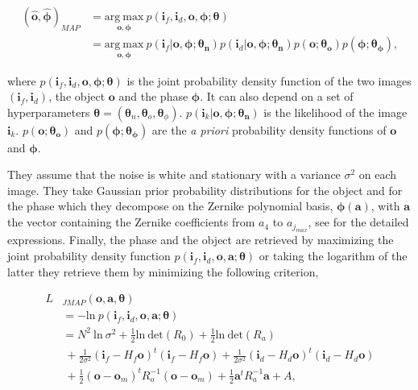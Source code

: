 \begin{align}
(\hat{\mathbf{o}},\hat{\boldsymbol{\phi}})_{MAP} &= \underset{\mathbf{o},\boldsymbol{\phi}}{\mathrm{arg \ max}} \ p(\mathbf{i}_f,\mathbf{i}_d,\mathbf{o},\boldsymbol{\phi};\boldsymbol{\theta})\nonumber \\
&= \underset{\mathbf{o},\boldsymbol{\phi}}{\mathrm{arg \ max}} \ p(\mathbf{i}_f|\mathbf{o},\boldsymbol{\phi};\boldsymbol{\theta_n})p(\mathbf{i}_d|\mathbf{o},\boldsymbol{\phi};\boldsymbol{\theta_n})p(\mathbf{o};\boldsymbol{\theta_o})p(\boldsymbol{\phi};\boldsymbol{\theta_{\phi}}), 
\end{align}

where $p(\mathbf{i}_f,\mathbf{i}_d,\mathbf{o},\boldsymbol{\phi};\boldsymbol{\theta})$ is the joint probability density function of the two images $(\mathbf{i}_f,\mathbf{i}_d)$, the object $\mathbf{o}$ and the phase $\boldsymbol{\phi}$. It can also depend on a set of hyperparameters $\boldsymbol{\theta} = (\boldsymbol{\theta}_n,\boldsymbol{\theta}_o,\boldsymbol{\theta}_{\phi})$. $p(\mathbf{i}_k|\mathbf{o},\boldsymbol{\phi};\boldsymbol{\theta_n})$ is the likelihood of the image $\mathbf{i}_k$. $p(\mathbf{o};\boldsymbol{\theta_o})$ and $p(\boldsymbol{\phi};\boldsymbol{\theta_{\phi}})$ are the \textit{a priori} probability density functions of $\mathbf{o}$ and $\boldsymbol{\phi}$.

They assume that the noise is white and stationary with a variance $\sigma^2$ on each image. They take Gaussian prior probability distributions for the object and for the phase which they decompose on the Zernike polynomial basis, $\boldsymbol{\phi}(\mathbf{a})$, with $\mathbf{a}$ the vector containing the Zernike coefficients from $a_4$ to $a_{j_{max}}$, see \citet[p.18-19]{mugnier_2006} for the detailed expressions. Finally, the phase and the object are retrieved by maximizing the joint probability density function $p(\mathbf{i}_f,\mathbf{i}_d,\mathbf{o},\mathbf{a};\boldsymbol{\theta})$ or taking the logarithm of the latter they retrieve them by minimizing the following criterion,

\begin{align}
L&_{JMAP}(\mathbf{o},\mathbf{a},\boldsymbol{\theta}) \nonumber\\
&= -\mathrm{ln} \ p(\mathbf{i}_f,\mathbf{i}_d,\mathbf{o},\mathbf{a};\boldsymbol{\theta}) \nonumber \\
&= N^2\ \mathrm{ln}\ \sigma^2 + \frac{1}{2}\mathrm{ln}\ \mathrm{det}(R_0) + \frac{1}{2}\mathrm{ln}\ \mathrm{det}(R_a)\nonumber\\
& \ + \frac{1}{2\sigma^2}(\mathbf{i}_f -H_f\mathbf{o})^t(\mathbf{i}_f -H_f\mathbf{o})+ \frac{1}{2\sigma^2}(\mathbf{i}_d - H_d \mathbf{o})^t(\mathbf{i}_d-H_d\mathbf{o})\nonumber\\
& \ + \frac{1}{2}(\mathbf{o}-\mathbf{o}_m)^t R_o^{-1}(\mathbf{o}-\mathbf{o}_m) + \frac{1}{2}\mathbf{a}^tR_a^{-1}\mathbf{a} + A,
\end{align}

